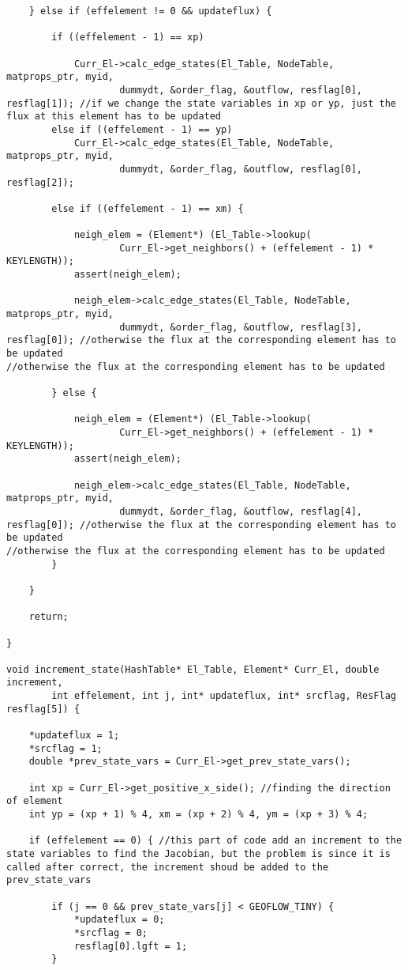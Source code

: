 \documentclass[a4paper,10pt]{article}
\begin{document}
\begin{lstlisting}
	} else if (effelement != 0 && updateflux) {

		if ((effelement - 1) == xp)

			Curr_El->calc_edge_states(El_Table, NodeTable, matprops_ptr, myid,
					dummydt, &order_flag, &outflow, resflag[0], resflag[1]); //if we change the state variables in xp or yp, just the flux at this element has to be updated
		else if ((effelement - 1) == yp)
			Curr_El->calc_edge_states(El_Table, NodeTable, matprops_ptr, myid,
					dummydt, &order_flag, &outflow, resflag[0], resflag[2]);

		else if ((effelement - 1) == xm) {

			neigh_elem = (Element*) (El_Table->lookup(
					Curr_El->get_neighbors() + (effelement - 1) * KEYLENGTH));
			assert(neigh_elem);

			neigh_elem->calc_edge_states(El_Table, NodeTable, matprops_ptr, myid,
					dummydt, &order_flag, &outflow, resflag[3], resflag[0]); //otherwise the flux at the corresponding element has to be updated
//otherwise the flux at the corresponding element has to be updated

		} else {

			neigh_elem = (Element*) (El_Table->lookup(
					Curr_El->get_neighbors() + (effelement - 1) * KEYLENGTH));
			assert(neigh_elem);

			neigh_elem->calc_edge_states(El_Table, NodeTable, matprops_ptr, myid,
					dummydt, &order_flag, &outflow, resflag[4], resflag[0]); //otherwise the flux at the corresponding element has to be updated
//otherwise the flux at the corresponding element has to be updated
		}

	}

	return;

}

void increment_state(HashTable* El_Table, Element* Curr_El, double increment,
		int effelement, int j, int* updateflux, int* srcflag, ResFlag resflag[5]) {

	*updateflux = 1;
	*srcflag = 1;
	double *prev_state_vars = Curr_El->get_prev_state_vars();

	int xp = Curr_El->get_positive_x_side(); //finding the direction of element
	int yp = (xp + 1) % 4, xm = (xp + 2) % 4, ym = (xp + 3) % 4;

	if (effelement == 0) { //this part of code add an increment to the state variables to find the Jacobian, but the problem is since it is called after correct, the increment shoud be added to the prev_state_vars

		if (j == 0 && prev_state_vars[j] < GEOFLOW_TINY) {
			*updateflux = 0;
			*srcflag = 0;
			resflag[0].lgft = 1;
		}


\end{lstlisting}
\end{document}

